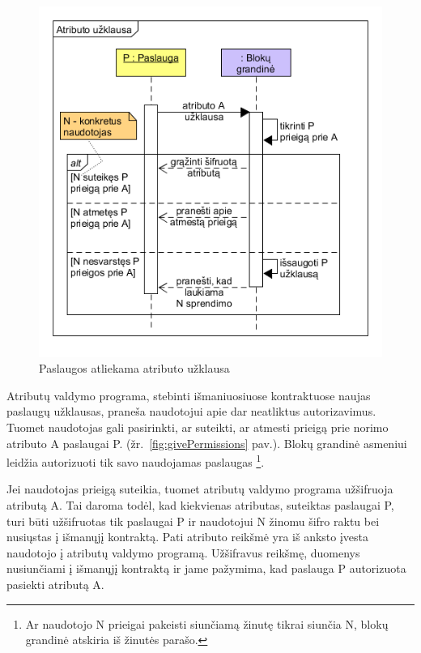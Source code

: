\begin{figure}[h]
    \centering
    \includegraphics[scale=0.7]{img/askForAttributeSequence}
    \caption{Paslaugos atliekama atributo užklausa}
    \label{fig:askForAttributeSequence}
\end{figure}


Atributų valdymo programa, stebinti išmaniuosiuose kontraktuose naujas paslaugų užklausas, praneša naudotojui apie dar
neatliktus autorizavimus. Tuomet naudotojas gali pasirinkti, ar suteikti, ar atmesti prieigą prie norimo atributo
A paslaugai P. (žr.\hypertarget{fig:givePermissions}{~\ref{fig:givePermissions} pav.}). Blokų grandinė asmeniui leidžia autorizuoti tik savo naudojamas paslaugas
\footnote{ Ar naudotojo N prieigai pakeisti siunčiamą žinutę tikrai siunčia N, blokų grandinė atskiria iš žinutės parašo.}.

Jei naudotojas prieigą suteikia, tuomet atributų valdymo programa užšifruoja atributą A. Tai
daroma todėl, kad kiekvienas atributas, suteiktas paslaugai P, turi būti užšifruotas tik paslaugai P ir naudotojui N
žinomu šifro raktu bei nusiųstas
į išmanųjį kontraktą. Pati atributo reikšmė yra iš anksto įvesta naudotojo į atributų valdymo programą.
Užšifravus reikšmę, duomenys nusiunčiami į išmanųjį kontraktą ir jame pažymima, kad paslauga P autorizuota
pasiekti atributą A.

